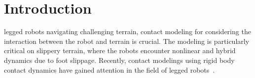 \section{Introduction} \label{Sec:Introduction}
 legged robots navigating challenging terrain, contact modeling for considering the interaction between the robot and terrain is crucial. The modeling is particularly critical on slippery terrain, where the robots encounter nonlinear and hybrid dynamics due to foot slippage.
Recently, contact modelings using rigid body contact dynamics have gained attention in the field of legged robots~\cite{wensing2024opti,lidec2023contact,mujoco,raisim}. 




